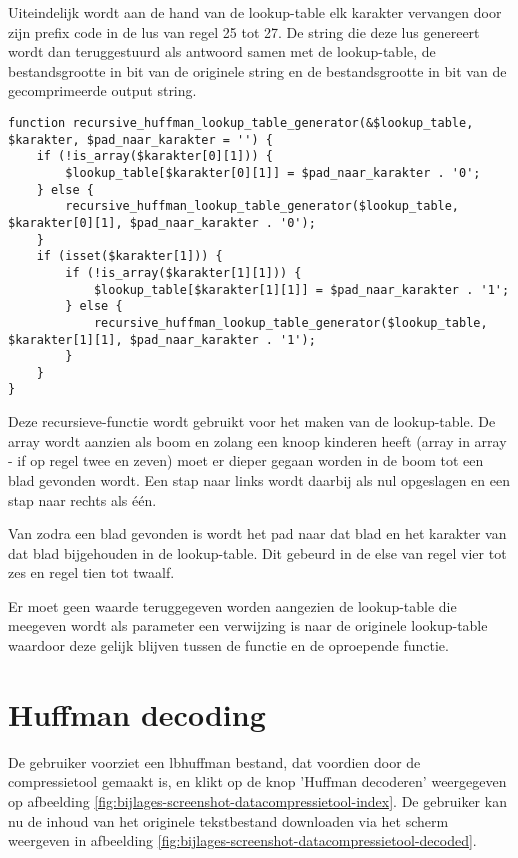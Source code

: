 Uiteindelijk wordt aan de hand van de \gls{lookup-table} elk karakter vervangen door zijn prefix code in de lus van regel 25 tot 27. De \gls{string} die deze lus genereert wordt dan teruggestuurd als antwoord samen met de \gls{lookup-table}, de bestandsgrootte in \gls{bit} van de originele \gls{string} en de bestandsgrootte in \gls{bit} van de gecomprimeerde output \gls{string}.

\begin{lstlisting}
function recursive_huffman_lookup_table_generator(&$lookup_table, $karakter, $pad_naar_karakter = '') {
	if (!is_array($karakter[0][1])) {
		$lookup_table[$karakter[0][1]] = $pad_naar_karakter . '0';
	} else {
		recursive_huffman_lookup_table_generator($lookup_table, $karakter[0][1], $pad_naar_karakter . '0');
	}
	if (isset($karakter[1])) {
		if (!is_array($karakter[1][1])) {
			$lookup_table[$karakter[1][1]] = $pad_naar_karakter . '1';
		} else {
			recursive_huffman_lookup_table_generator($lookup_table, $karakter[1][1], $pad_naar_karakter . '1');
		}
	}
}
\end{lstlisting}

Deze \gls{recursieve-functie} wordt gebruikt voor het maken van de \gls{lookup-table}. De \gls{array} wordt aanzien als boom en zolang een knoop kinderen heeft (array in array - if op regel twee en zeven) moet er dieper gegaan worden in de boom tot een blad gevonden wordt. Een stap naar links wordt daarbij als nul opgeslagen en een stap naar rechts als één. 

Van zodra een blad gevonden is wordt het pad naar dat blad en het karakter van dat blad bijgehouden in de \gls{lookup-table}. Dit gebeurd in de else van regel vier tot zes en regel tien tot twaalf.

Er moet geen waarde teruggegeven worden aangezien de \gls{lookup-table} die meegeven wordt als parameter een verwijzing is naar de originele \gls{lookup-table} waardoor deze gelijk blijven tussen de functie en de oproepende functie.

\section{Huffman decoding}
\label{sec:compressietool-huffman-decoding}

De gebruiker voorziet een \gls{lbhuffman} bestand, dat voordien door de \gls{compressietool} gemaakt is, en klikt op de knop 'Huffman decoderen' weergegeven op afbeelding \ref{fig:bijlages-screenshot-datacompressietool-index}. De gebruiker kan nu de inhoud van het originele tekstbestand downloaden via het scherm weergeven in afbeelding \ref{fig:bijlages-screenshot-datacompressietool-decoded}.

